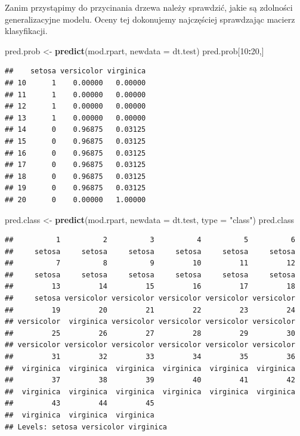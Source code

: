 \documentclass[]{book}
\newenvironment{Shaded}{\begin{snugshade}}{\end{snugshade}}
\newcommand{\DataTypeTok}[1]{\textcolor[rgb]{0.13,0.29,0.53}{#1}}
\newcommand{\DecValTok}[1]{\textcolor[rgb]{0.00,0.00,0.81}{#1}}
\newcommand{\KeywordTok}[1]{\textcolor[rgb]{0.13,0.29,0.53}{\textbf{#1}}}
\newcommand{\NormalTok}[1]{#1}
\newcommand{\OperatorTok}[1]{\textcolor[rgb]{0.81,0.36,0.00}{\textbf{#1}}}
\newcommand{\StringTok}[1]{\textcolor[rgb]{0.31,0.60,0.02}{#1}}
\theoremstyle{plain}
\theoremstyle{definition}
\begin{document}
Zanim przystąpimy do przycinania drzewa należy sprawdzić, jakie są zdolności generalizacyjne modelu. Oceny tej dokonujemy najczęściej sprawdzając macierz klasyfikacji.

\begin{Shaded}
\begin{Highlighting}[]
\NormalTok{pred.prob <-}\StringTok{ }\KeywordTok{predict}\NormalTok{(mod.rpart, }
                     \DataTypeTok{newdata =}\NormalTok{ dt.test)}
\NormalTok{pred.prob[}\DecValTok{10}\OperatorTok{:}\DecValTok{20}\NormalTok{,]}
\end{Highlighting}
\end{Shaded}

\begin{verbatim}
##    setosa versicolor virginica
## 10      1    0.00000   0.00000
## 11      1    0.00000   0.00000
## 12      1    0.00000   0.00000
## 13      1    0.00000   0.00000
## 14      0    0.96875   0.03125
## 15      0    0.96875   0.03125
## 16      0    0.96875   0.03125
## 17      0    0.96875   0.03125
## 18      0    0.96875   0.03125
## 19      0    0.96875   0.03125
## 20      0    0.00000   1.00000
\end{verbatim}

\begin{Shaded}
\begin{Highlighting}[]
\NormalTok{pred.class <-}\StringTok{ }\KeywordTok{predict}\NormalTok{(mod.rpart, }
                      \DataTypeTok{newdata =}\NormalTok{ dt.test,}
                      \DataTypeTok{type =} \StringTok{"class"}\NormalTok{)}
\NormalTok{pred.class}
\end{Highlighting}
\end{Shaded}

\begin{verbatim}
##          1          2          3          4          5          6 
##     setosa     setosa     setosa     setosa     setosa     setosa 
##          7          8          9         10         11         12 
##     setosa     setosa     setosa     setosa     setosa     setosa 
##         13         14         15         16         17         18 
##     setosa versicolor versicolor versicolor versicolor versicolor 
##         19         20         21         22         23         24 
## versicolor  virginica versicolor versicolor versicolor versicolor 
##         25         26         27         28         29         30 
## versicolor versicolor versicolor versicolor versicolor versicolor 
##         31         32         33         34         35         36 
##  virginica  virginica  virginica  virginica  virginica  virginica 
##         37         38         39         40         41         42 
##  virginica  virginica  virginica  virginica  virginica  virginica 
##         43         44         45 
##  virginica  virginica  virginica 
## Levels: setosa versicolor virginica
\end{verbatim}
\end{document}
